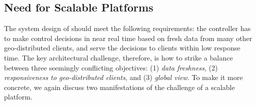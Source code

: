 \begin{itemize}
\end{itemize}




\subsection{Need for Scalable Platforms}
\label{subsec:overview:challenge2}

The system design of \ddn should meet the following requirements:
the \ddn controller has to make control decisions 
in near real time based on fresh data from many
other geo-distributed clients, and serve the decisions 
to clients within low response time.
The key architectural challenge, therefore,
is how to strike a balance between three seemingly
conflicting objectives: 
(1) {\em data freshness}, 
(2) {\em responsiveness to geo-distributed clients},
and (3) {\em global view}.
To make it more concrete, we again discuss two 
manifestations of the challenge of a scalable platform.

